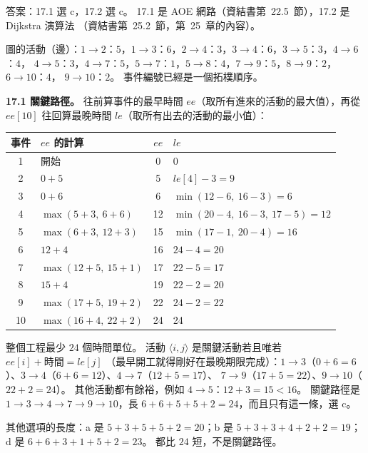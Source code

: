\begin{pastsoln}
答案：17.1 選 c，17.2 選 c。 17.1 是 AOE 網路（資結書第~22.5~節），17.2 是 Dijkstra 演算法
（資結書第~25.2~節，第~25~章的內容）。

圖的活動（邊）：$1 \to 2$：$5$，$1 \to 3$：$6$，$2 \to 4$：$3$，$3 \to 4$：$6$，$3 \to 5$：$3$，$4 \to 6$：$4$，
$4 \to 5$：$3$，$4 \to 7$：$5$，$5 \to 7$：$1$，$5 \to 8$：$4$，$7 \to 9$：$5$，$8 \to 9$：$2$，$6 \to 10$：$4$，
$9 \to 10$：$2$。 事件編號已經是一個拓樸順序。

\textbf{17.1 關鍵路徑。} 往前算事件的最早時間 $\mathit{ee}$（取所有進來的活動的最大值），再從 $\mathit{ee}[10]$
往回算最晚時間 $\mathit{le}$（取所有出去的活動的最小值）：
\begin{center}
\small
\begin{tabular}{clcl}
\toprule
事件 & $\mathit{ee}$ 的計算 & $\mathit{ee}$ & $\mathit{le}$ \\
\midrule
1 & 開始 & 0 & 0 \\
2 & $0 + 5$ & 5 & $\mathit{le}[4] - 3 = 9$ \\
3 & $0 + 6$ & 6 & $\min(12 - 6,\ 16 - 3) = 6$ \\
4 & $\max(5 + 3,\ 6 + 6)$ & 12 & $\min(20 - 4,\ 16 - 3,\ 17 - 5) = 12$ \\
5 & $\max(6 + 3,\ 12 + 3)$ & 15 & $\min(17 - 1,\ 20 - 4) = 16$ \\
6 & $12 + 4$ & 16 & $24 - 4 = 20$ \\
7 & $\max(12 + 5,\ 15 + 1)$ & 17 & $22 - 5 = 17$ \\
8 & $15 + 4$ & 19 & $22 - 2 = 20$ \\
9 & $\max(17 + 5,\ 19 + 2)$ & 22 & $24 - 2 = 22$ \\
10 & $\max(16 + 4,\ 22 + 2)$ & 24 & 24 \\
\bottomrule
\end{tabular}
\end{center}
整個工程最少 $24$ 個時間單位。 活動 $\langle i, j \rangle$ 是關鍵活動若且唯若 $\mathit{ee}[i] + \text{時間} = \mathit{le}[j]$
（最早開工就得剛好在最晚期限完成）：$1 \to 3$（$0 + 6 = 6$）、$3 \to 4$（$6 + 6 = 12$）、$4 \to 7$（$12 + 5 = 17$）、
$7 \to 9$（$17 + 5 = 22$）、$9 \to 10$（$22 + 2 = 24$）。 其他活動都有餘裕，例如 $4 \to 5$：$12 + 3 = 15 < 16$。
關鍵路徑是 $1 \to 3 \to 4 \to 7 \to 9 \to 10$，長 $6 + 6 + 5 + 5 + 2 = 24$，而且只有這一條，選 c。

其他選項的長度：a 是 $5 + 3 + 5 + 5 + 2 = 20$；b 是 $5 + 3 + 3 + 4 + 2 + 2 = 19$；d 是 $6 + 6 + 3 + 1 + 5 + 2 = 23$。
都比 $24$ 短，不是關鍵路徑。


\end{pastsoln}
